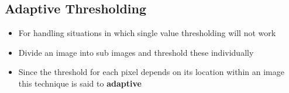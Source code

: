 \subsection*{Adaptive Thresholding}

\begin{itemize}
  \item For handling situations in which single value thresholding will not work
  \item Divide an image into sub images and threshold these individually
  \item Since the threshold for each pixel depends on its location within an image this technique is said to \textbf{adaptive}
\end{itemize}

